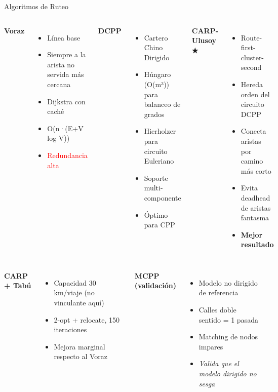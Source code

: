 \documentclass[11pt,aspectratio=169]{beamer}
\begin{document}
\begin{frame}{Algoritmos de Ruteo}
\begin{columns}[T]
\textbf{Voraz}
\begin{itemize}
  \item Línea base
  \item Siempre a la arista no servida más cercana
  \item Dijkstra con caché
  \item O(n·(E+V log V))
  \item \textcolor{red}{Redundancia alta}
\end{itemize}

\textbf{DCPP}
\begin{itemize}
  \item Cartero Chino Dirigido
  \item Húngaro (O(m³)) para balanceo de grados
  \item Hierholzer para circuito Euleriano
  \item Soporte multi-componente
  \item \textcolor{mygreen}{Óptimo para CPP}
\end{itemize}

\textbf{CARP-Ulusoy ★}
\begin{itemize}
  \item Route-first-cluster-second
  \item Hereda orden del circuito DCPP
  \item Conecta aristas por camino más corto
  \item Evita deadhead de aristas fantasma
  \item \textcolor{mygold}{\textbf{Mejor resultado}}
\end{itemize}
\end{columns}

\vspace{12pt}
\begin{columns}[T]
\textbf{CARP + Tabú}
\begin{itemize}
  \item Capacidad 30 km/viaje (no vinculante aquí)
  \item 2-opt + relocate, 150 iteraciones
  \item Mejora marginal respecto al Voraz
\end{itemize}

\textbf{MCPP (validación)}
\begin{itemize}
  \item Modelo no dirigido de referencia
  \item Calles doble sentido = 1 pasada
  \item Matching de nodos impares
  \item \textit{Valida que el modelo dirigido no sesga}
\end{itemize}
\end{columns}
\end{frame}
\end{document}
